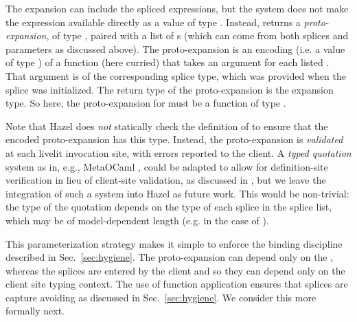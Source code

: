 The expansion can include the spliced expressions, 
but the system does not make the expression  
available directly as a value of type . 
Instead,  returns a \emph{proto-expansion}, of type , 
paired with a list of s (which can come from 
both splices and parameters as discussed above).
The {proto-expansion}
 is an encoding (i.e. a value of type ) of a function 
 (here curried)
 that takes an argument for each listed . 
 That argument is of the corresponding splice 
type, which was provided when the splice was initialized. 
 The return type of the proto-expansion is the expansion type.
 So here, the proto-expansion for  must be a function of type 
 .

Note that Hazel does \emph{not} statically check the definition of 
to ensure that the encoded proto-expansion has this type. Instead, the proto-expansion 
is \emph{validated} at each livelit invocation site, with errors reported to the client. 
A \emph{typed quotation} system as in, e.g., MetaOCaml \cite{DBLP:conf/flops/Kiselyov14}, could be adapted to allow for definition-site verification 
in lieu of client-site validation, as discussed in \cite{TLMs}, but we leave the integration 
of such a system into Hazel as future work. This would be non-trivial:  
the type of the quotation depends on the type of each splice in 
the splice list, which may be of model-dependent length (e.g. in the case of ).

This parameterization strategy makes it simple to enforce the binding discipline described in Sec.~\ref{sec:hygiene}. 
The proto-expansion 
can depend only on the , whereas the splices are entered by the client and so they can 
depend only on the client site typing context. The use of function application ensures
that splices are capture avoiding as discussed in Sec.~\ref{sec:hygiene}. 
We consider this more formally next.
